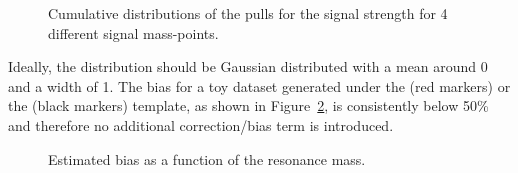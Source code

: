 \begin{figure}[h!]
\caption{Cumulative distributions of the pulls for the signal strength for 4 different signal mass-points.}
\label{fig:pullsMuCombo16}
\end{figure}
Ideally, the distribution should be Gaussian distributed with a mean around 0 and a width of 1. The bias for a toy dataset generated under the  (red markers) or the \HERWIG{++} (black markers) template, as shown in Figure~\ref{fig:bias}, is consistently below 50\% and therefore no additional correction/bias term is introduced.
\begin{figure}[h!]
\centering
{}
\caption{Estimated bias as a function of the resonance mass.}
\label{fig:bias}
\end{figure}
